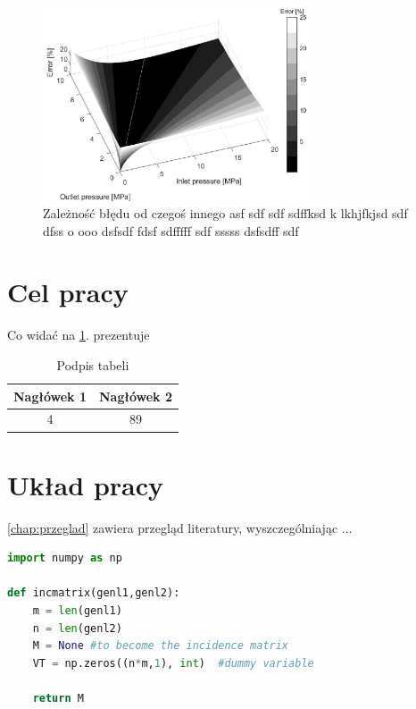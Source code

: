 \begin{figure}[h]
    \centering
    \includegraphics[width=0.7\textwidth]{./img/Figure3.eps}
    \caption{Zależność błędu od czegoś innego asf sdf sdf sdffksd k lkhjfkjsd sdf dfss o ooo  dsfsdf fdsf sdfffff sdf sssss dsfsdff sdf}
    \label{fig:nasz_obrazek}
\end{figure}

\section{Cel pracy}

Co widać na \cref{fig:nasz_obrazek}.  prezentuje

\begin{table}[b]%
    \centering
    \caption{Podpis tabeli}
    \begin{tabular}{|c|c||}
        \hline
        \textbf{Nagłówek 1} & \textbf{Nagłówek 2 } \\ \hline
        4 & 89  \\ \hline
    \end{tabular}
    \label{tab:nasza_tabela}
\end{table}
\section{Układ pracy}

\cref{chap:przeglad} zawiera przegląd literatury, wyszczególniając ...

\begin{lstlisting}[language=Python,caption={Opis kodu},captionpos=b,label={lst:kod}]
import numpy as np
    
def incmatrix(genl1,genl2):
    m = len(genl1)
    n = len(genl2)
    M = None #to become the incidence matrix
    VT = np.zeros((n*m,1), int)  #dummy variable
    
    return M
\end{lstlisting}


